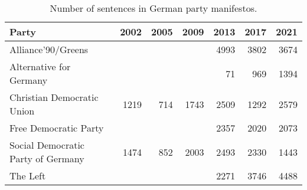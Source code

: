 \begin{table}[!t]

\caption{\label{tab:num_sentences_de-manifestos}Number of sentences in German party manifestos.}
\centering
\fontsize{10}{12}\selectfont
\begin{tabular}[t]{lrrrrrr}
\toprule
Party & 2002 & 2005 & 2009 & 2013 & 2017 & 2021\\
\midrule
Alliance'90/Greens &  &  &  & 4993 & 3802 & 3674\\
Alternative for Germany &  &  &  & 71 & 969 & 1394\\
Christian Democratic Union & 1219 & 714 & 1743 & 2509 & 1292 & 2579\\
Free Democratic Party &  &  &  & 2357 & 2020 & 2073\\
Social Democratic Party of Germany & 1474 & 852 & 2003 & 2493 & 2330 & 1443\\
The Left &  &  &  & 2271 & 3746 & 4488\\
\bottomrule
\end{tabular}
\end{table}
